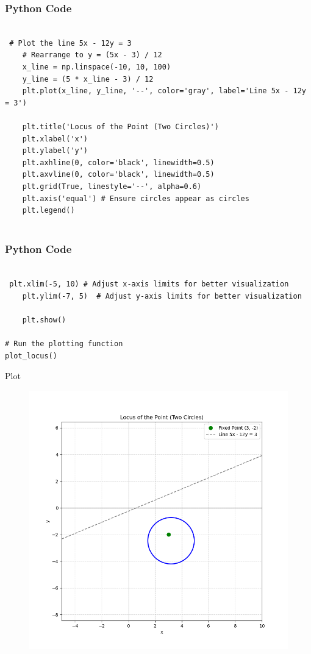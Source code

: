\documentclass{beamer}
\begin{document}
\begin{frame}[fragile]
    \frametitle{Python Code }
    \begin{lstlisting}

 # Plot the line 5x - 12y = 3
    # Rearrange to y = (5x - 3) / 12
    x_line = np.linspace(-10, 10, 100)
    y_line = (5 * x_line - 3) / 12
    plt.plot(x_line, y_line, '--', color='gray', label='Line 5x - 12y = 3')

    plt.title('Locus of the Point (Two Circles)')
    plt.xlabel('x')
    plt.ylabel('y')
    plt.axhline(0, color='black', linewidth=0.5)
    plt.axvline(0, color='black', linewidth=0.5)
    plt.grid(True, linestyle='--', alpha=0.6)
    plt.axis('equal') # Ensure circles appear as circles
    plt.legend()
   

        \end{lstlisting}
\end{frame}

\begin{frame}[fragile]
    \frametitle{Python Code }
    \begin{lstlisting}

 plt.xlim(-5, 10) # Adjust x-axis limits for better visualization
    plt.ylim(-7, 5)  # Adjust y-axis limits for better visualization
    
    plt.show()

# Run the plotting function
plot_locus()

        \end{lstlisting}
\end{frame}


\begin{frame}{Plot}

\begin{figure}
    \centering
    \includegraphics[width=0.7
    \linewidth]{Beamer/figs/circle.png}
    \caption{}
    \label{fig:placeholder}
\end{figure}

\end{frame}
\end{document}
